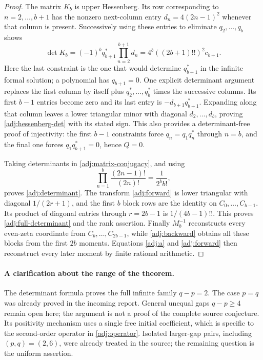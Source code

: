 \documentclass[11pt,a4paper]{article}
\numberwithin{equation}{section}
\theoremstyle{definition}
\theoremstyle{remark}
\begin{document}
\begin{proof}
The matrix $K_b$ is upper Hessenberg.  Its row corresponding to
$n=2,\ldots,b+1$ has the nonzero next-column entry
$d_n=4(2n-1)^2$ whenever that column is present.  Successively
using these entries to eliminate $q_2,\ldots,q_b$ shows
\begin{equation}\label{adj:hessenberg-det}
 \det K_b=(-1)^b q_{b+1}^*\prod_{n=2}^{b+1}d_n
 =4^b((2b+1)!!)^2c_{b+1}.
\end{equation}
Here the last constraint is the one that would determine
$q_{b+1}^*$ in the infinite formal solution; a polynomial has
$q_{b+1}=0$.  One explicit determinant argument replaces the first
column by itself plus $q_2^*,\ldots,q_b^*$ times the successive
columns.  Its first $b-1$ entries become zero and its last entry
is $-d_{b+1}q_{b+1}^*$.  Expanding along that column leaves a
lower triangular minor with diagonal $d_2,\ldots,d_b$, proving
\eqref{adj:hessenberg-det} with its stated sign.
This also provides a determinant-free proof of
injectivity: the first $b-1$ constraints force
$q_n=q_1q_n^*$ through $n=b$, and the final one forces
$q_1q_{b+1}^*=0$, hence $Q=0$.

Taking determinants in \eqref{adj:matrix-conjugacy}, and using
\[
 \prod_{n=1}^{b}\frac{(2n-1)!}{(2n)!}=\frac1{2^bb!},
\]
proves \eqref{adj:determinant}.  The transform
\eqref{adj:forward} is lower triangular with diagonal
$1/(2r+1)$, and the first $b$ block rows are the identity on
$C_0,\ldots,C_{b-1}$.  Its product of diagonal entries through
$r=2b-1$ is $1/(4b-1)!!$.  This proves
\eqref{adj:full-determinant} and the rank assertion.  Finally
$M_b^{-1}$ reconstructs every even-zeta coordinate from
$C_b,\ldots,C_{2b-1}$, while \eqref{adj:backward} obtains all
these blocks from the first $2b$ moments.  Equations
\eqref{adj:a} and \eqref{adj:forward} then reconstruct every
later moment by finite rational arithmetic.
\end{proof}

\paragraph{A clarification about the range of the theorem.}
The determinant formula proves the full infinite family $q-p=2$.
The case $p=q$ was already proved in the incoming report.  General
unequal gaps $q-p\ge4$ remain open here; the argument is not a
proof of the complete source conjecture.  Its positivity mechanism
uses a single free initial coefficient, which is specific to the
second-order operator in \eqref{adj:operator}.
Isolated larger-gap pairs, including $(p,q)=(2,6)$, were already
treated in the source; the remaining question is the uniform assertion.
\end{document}

